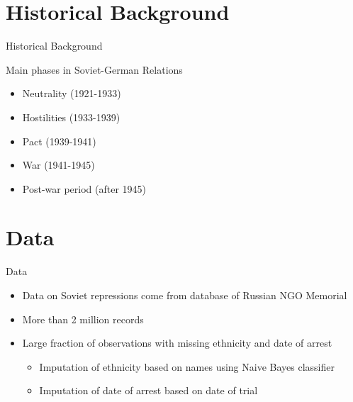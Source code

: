 \documentclass[11pt]{beamer}
\begin{document}
\section{Historical Background}
\begin{frame}{Historical Background}
 \begin{block}{Main phases in Soviet-German Relations}
    {
        \begin{itemize}
        \item Neutrality (1921-1933) 
        \item Hostilities (1933-1939)
        \item Pact (1939-1941)
        \item War (1941-1945)
        \item Post-war period (after 1945)
        \end{itemize}
    }
    \end{block}
\end{frame}

\section{Data}
\begin{frame}[label=data]{Data}
\begin{itemize}
    \item Data on Soviet repressions come from database of Russian NGO  Memorial
    \item More than 2 million records
    \item Large fraction of observations with missing ethnicity and date of arrest 
    \begin{itemize}
        \item Imputation of ethnicity based on names using Naive Bayes  classifier  \hyperlink{ethnicity_imputation}{}
        \item Imputation of date of arrest based on date of trial \hyperlink{arrest_date_imputation}{}
    \end{itemize}
    
\end{itemize}
\end{frame}
\end{document}
